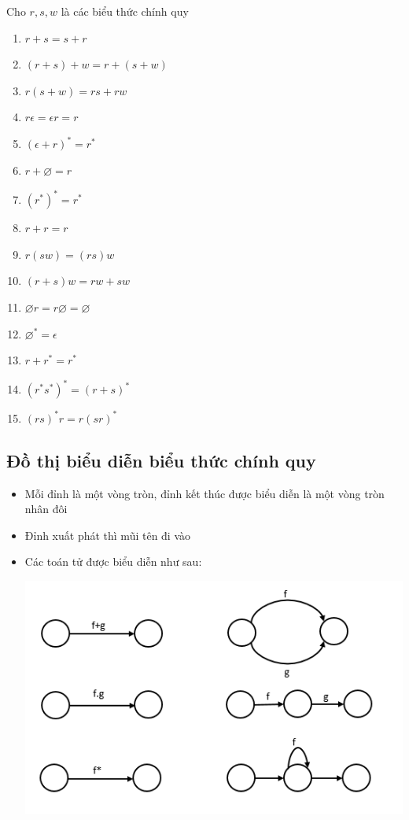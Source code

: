 \documentclass[14pt]{extreport}
\begin{document}
Cho $r,s,w$ là các biểu thức chính quy
\begin{enumerate}
\item $r+s=s+r$
\item $\left(r+s\right)+w=r+\left(s+w\right)$
\item $r\left(s+w\right)=rs+rw$
\item $r\epsilon=\epsilon r=r$
\item ${\left(\epsilon+r\right)}^*=r^*$
\item $r+\varnothing=r$
\item ${\left( r^*\right)}^*=r^*$
\item $r+r=r$
\item $r\left(sw\right)=\left(rs\right)w$
\item $\left(r+s\right)w=rw+sw$
\item $\varnothing r=r\varnothing=\varnothing$
\item $\varnothing^*=\epsilon$
\item $r+r^*=r^*$
\item ${\left(r^* s^*\right)}^*={\left(r+s\right)}^*$
\item ${\left(rs\right)}^*r=r{\left(sr\right)}^*$
\end{enumerate}
\subsection{Đồ thị biểu diễn biểu thức chính quy}
\begin{itemize}
\item Mỗi đỉnh là một vòng tròn, đỉnh kết thúc được biểu diễn là một vòng tròn nhân đôi
\item Đỉnh xuất phát thì mũi tên đi vào
\item Các toán tử được biểu diễn như sau:
\begin{center}
\includegraphics[scale=1.1]{dothibtcq}
\end{center}
\end{itemize}
\end{document}
